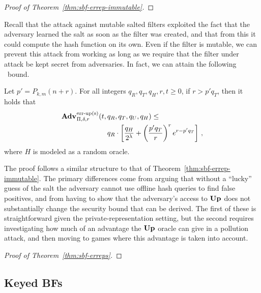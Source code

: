 \begin{proof}[Proof of Theorem~\ref{thm:sbf-errep-immutable}]
  
\end{proof}


Recall that the attack against mutable salted filters exploited the fact that
the adversary learned the salt as soon as the filter was created, and that from
this it could compute the hash function on its own. Even if the filter is
mutable, we can prevent this attack from working as long as we require that the
filter under attack be kept secret from adversaries. In fact, we can attain the
following \erreps\ bound.

\begin{theorem}\label{thm:sbf-erreps}
  Let $p' = P_{k,m}(n+r)$.
  For all integers $q_R, q_T, q_H, r, t \geq 0$, if
  $r > p'q_T$, then it holds that
  \begin{eqnarray*}
    \begin{aligned}
      \Adv{\erreps}_{\Pi,\delta,r}(t,\,&q_R, q_T, q_U, q_H) \leq \\
          & q_R \cdot \left[
      \frac{q_H}{2^\lambda} +
      \left(\frac{p'q_T}{r}\right)^re^{r-p'q_T}\right]\,,
    \end{aligned}
\end{eqnarray*}
  where $H$ is modeled as a random oracle.
\end{theorem}

The proof follows a similar structure to that of
Theorem~\ref{thm:sbf-errep-immutable}. The primary differences come from arguing
that without a ``lucky'' guess of the salt the adversary cannot use offline hash
queries to find false positives, and from having to show that the adversary's
access to $\textup{\textbf{Up}}\hspace{0.5pt}$ does not substantially change the security bound that can be
derived. The first of these is straightforward given the private-representation
setting, but the second requires investigating how much of an advantage the
$\textup{\textbf{Up}}\hspace{0.5pt}$ oracle can give in a pollution attack, and then moving to games where
this advantage is taken into account.
%

\begin{proof}[Proof of Theorem~\ref{thm:sbf-erreps}]
  
\end{proof}

\subsection{Keyed BFs}

